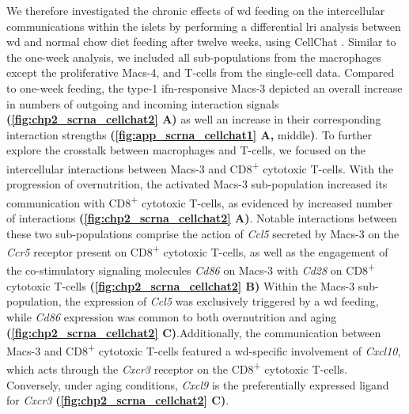 \par We therefore investigated the chronic effects of \gls{wd} feeding on the intercellular communications within the islets by performing a differential \gls{lri} analysis between \gls{wd} and normal chow diet feeding after twelve weeks, using CellChat \textbf{\cite{jin_cellchat_2023}}. Similar to the one-week analysis, we included all sub-populations from the macrophages except the proliferative Macs-4, and T-cells from the single-cell data. Compared to one-week feeding, the type-1 \gls{ifn}-responsive Macs-3 depicted an overall increase in numbers of outgoing and incoming interaction signals \textbf{(\autoref{fig:chp2_scrna_cellchat2} A)} as well an increase in their corresponding interaction strengths \textbf{(\autoref{fig:app_scrna_cellchat1} A,} middle\textbf{)}. To further explore the crosstalk between macrophages and T-cells, we focused on the intercellular interactions between Macs-3 and CD8\textsuperscript{+} cytotoxic T-cells. With the progression of overnutrition, the activated Macs-3 sub-population increased its communication with CD8\textsuperscript{+} cytotoxic T-cells, as evidenced by increased number of interactions \textbf{(\autoref{fig:chp2_scrna_cellchat2} A)}. Notable interactions between these two sub-populations comprise the action of \textit{Ccl5} secreted by Macs-3 on the \textit{Ccr5} receptor present on CD8\textsuperscript{+} cytotoxic T-cells, as well as the engagement of the co-stimulatory signaling molecules \textit{Cd86} on Macs-3 with \textit{Cd28} on CD8\textsuperscript{+} cytotoxic T-cells \textbf{(\autoref{fig:chp2_scrna_cellchat2} B)} Within the Macs-3 sub-population, the expression of \textit{Ccl5} was exclusively triggered by a \gls{wd} feeding, while \textit{Cd86} expression was common to both overnutrition and aging \textbf{(\autoref{fig:chp2_scrna_cellchat2} C)}.Additionally, the communication between Macs-3 and CD8\textsuperscript{+} cytotoxic T-cells featured a \gls{wd}-specific involvement of \textit{Cxcl10}, which acts through the \textit{Cxcr3} receptor on the CD8\textsuperscript{+} cytotoxic T-cells. Conversely, under aging conditions, \textit{Cxcl9} is the preferentially expressed ligand for           \textit{Cxcr3} \textbf{(\autoref{fig:chp2_scrna_cellchat2} C)}.\\

